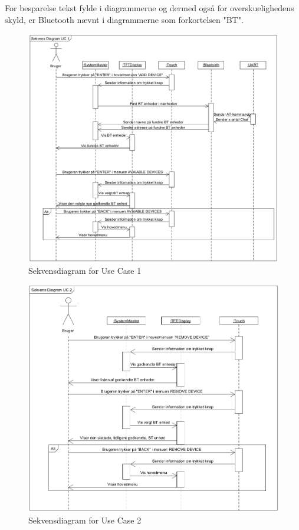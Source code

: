 For besparelse tekst fylde i diagrammerne og dermed også for overskuelighedens skyld, er Bluetooth nævnt i diagrammerne som forkortelsen "BT".

\hfill \break
\hfill \break

\begin{figure}[H]
	\centering
	\includegraphics[width = 400 pt]{Img/SD1.png}
	\caption{Sekvensdiagram for Use Case 1}
	\label{fig:SD1}
\end{figure}

\hfill \break
\hfill \break
\hfill \break
\hfill \break
\hfill \break
\hfill \break
\hfill \break
\hfill \break

\begin{figure}[H]
	\centering
	\includegraphics[width = 400 pt]{Img/SD2.png}
	\caption{Sekvensdiagram for Use Case 2}
	\label{fig:SD2}
\end{figure}

